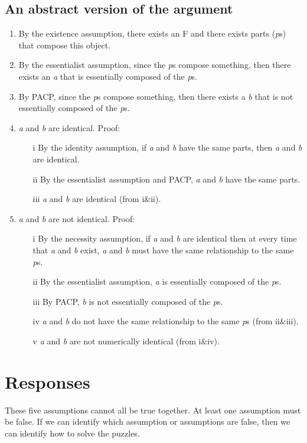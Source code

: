 \documentclass[9pt]{article}
\begin{document}
\subsection*{An abstract version of the argument}

\begin{enumerate}
\item By the existence assumption, there exists an F and there exists parts (\emph{p}s) that compose this object. 
\item By the essentialist assumption, since the \emph{p}s compose something, then there exists an \emph{a} that is essentially composed of the \emph{p}s. 
\item By PACP, since the \emph{p}s compose something, then there exists a \emph{b}  that is not essentially composed of the \emph{p}s. 
\item \emph{a} and \emph{b} are identical. Proof: 
\begin{enumerate}
\item[i] By the identity assumption, if \emph{a} and \emph{b} have the same parts, then \emph{a} and \emph{b} are identical. 
\item[ii] By the essentialist assumption and PACP, \emph{a} and \emph{b} have the same parts. 
\item[iii] \emph{a} and \emph{b} are identical (from i\&ii).
\end{enumerate}
\item \emph{a} and \emph{b} are not identical. Proof: 
\begin{enumerate} 
\item[i] By the necessity assumption, if \emph{a} and \emph{b} are identical then at every time that \emph{a} and \emph{b} exist, \emph{a} and \emph{b} must have the same relationship to the same \emph{p}s. 
\item[ii] By the essentialist assumption, \emph{a} is essentially composed of the \emph{p}s. 
\item[iii] By PACP, \emph{b} is not essentially composed of the \emph{p}s. 
\item[iv] \emph{a} and \emph{b} do not have the same relationship to the same \emph{p}s (from ii\&iii).
\item[v] \emph{a} and \emph{b} are not numerically identical (from i\&iv).
\end{enumerate}
\end{enumerate}



\section{Responses} 
These five assumptions cannot all be true together. At least one assumption must be  false. If we can identify which assumption or assumptions are false, then we can  identify how to solve the puzzles. 
\end{document}
